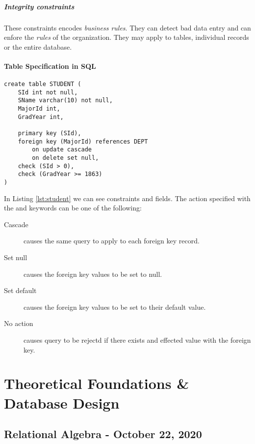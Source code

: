 \documentclass[11pt,a4paper,twocolumn]{book}
\begin{document}
\subsubsection{Integrity constraints}

These constraints encodes \textit{business rules}. They can detect bad data entry and can enfore the \textit{rules} of the organization. They may apply to tables, individual records or the entire database.

\subsection{Table Specification in SQL}

\begin{lstlisting}[caption={the SQL specification of the STUDENT table},label={lst:student}]
create table STUDENT (
	SId int not null,
	SName varchar(10) not null,
	MajorId int,
	GradYear int,
	
	primary key (SId),
	foreign key (MajorId) references DEPT
		on update cascade
		on delete set null,
	check (SId > 0),
	check (GradYear >= 1863)
)
\end{lstlisting}

In Listing \ref{lst:student} we can see constraints and fields. The action specified with the  and  keywords can be one of the following:

\begin{description}
\item[Cascade] causes the same query to apply to each foreign key record.
\item[Set null] causes the foreign key values to be set to null.
\item[Set default] causes the foreign key values to be set to their default value.
\item[No action] causes query to be rejectd if there exists and effected value with the foreign key.
\end{description}

\part{Theoretical Foundations \& Database Design}

\chapter{Relational Algebra - October 22, 2020}
\end{document}
